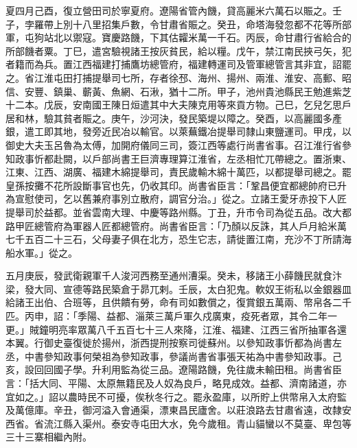\begin{pinyinscope}
 夏四月己酉，復立營田司於寧夏府。遼陽省管內饑，貸高麗米六萬石以賑之。壬子，孛羅帶上別十八里招集戶數，令甘肅省賑之。癸丑，命塔海發忽都不花等所部軍，屯狗站北以禦寇。寶慶路饑，下其估糶米萬一千石。丙辰，命甘肅行省給合的所部饑者粟。丁巳，遣宮驗視諸王按灰貧民，給以糧。戊午，禁江南民挾弓矢，犯者籍而為兵。置江西福建打捕鷹坊總管府，福建轉運司及管軍總管言其非宜，詔罷之。省江淮屯田打捕提舉司七所，存者徐邳、海州、揚州、兩淮、淮安、高郵、昭信、安豐、鎮巢、蘄黃、魚網、石湫，猶十二所。甲子，池州貴池縣民王勉進紫芝十二本。戊辰，安南國王陳日烜遣其中大夫陳克用等來貢方物。己巳，乞兒乞思戶居和林，驗其貧者賑之。庚午，沙河決，發民築堤以障之。癸酉，以高麗國多產銀，遣工即其地，發旁近民冶以輸官。以萊蕪鐵冶提舉司隸山東鹽運司。甲戌，以御史大夫玉呂魯為太傅，加開府儀同三司，簽江西等處行尚書省事。召江淮行省參知政事忻都赴闕，以戶部尚書王巨濟專理算江淮省，左丞相忙兀帶總之。置浙東、江東、江西、湖廣、福建木綿提舉司，責民歲輸木綿十萬匹，以都提舉司總之。罷皇孫按攤不花所設斷事官也先，仍收其印。尚書省臣言：「鞏昌便宜都總帥府已升為宣慰使司，乞以舊兼府事別立散府，調官分治。」從之。立諸王愛牙赤投下人匠提舉司於益都。並省雲南大理、中慶等路州縣。丁丑，升市令司為從五品。改大都路甲匠總管府為軍器人匠都總管府。尚書省臣言：「乃顏以反誅，其人戶月給米萬七千五百二十三石，父母妻子俱在北方，恐生它志，請徙置江南，充沙不丁所請海船水軍。」從之。



 五月庚辰，發武衛親軍千人浚河西務至通州漕渠。癸未，移諸王小薛饑民就食汴梁，發大同、宣德等路民築倉于昴兀剌。壬辰，太白犯鬼。軟奴王術私以金銀器皿給諸王出伯、合班等，且供饋有勞，命有司如數償之，復賞銀五萬兩、幣帛各二千匹。丙申，詔：「季陽、益都、淄萊三萬戶軍久戍廣東，疫死者眾，其令二年一更。」賊鐘明亮率眾萬八千五百七十三人來降，江淮、福建、江西三省所抽軍各還本翼。行御史臺復徙於揚州，浙西提刑按察司徙蘇州。以參知政事忻都為尚書左丞，中書參知政事何榮祖為參知政事，參議尚書省事張天祐為中書參知政事。己亥，設回回國子學。升利用監為從三品。遼陽路饑，免往歲未輸田租。尚書省臣言：「括大同、平陽、太原無籍民及人奴為良戶，略見成效。益都、濟南諸道，亦宜如之。」詔以農時民不可擾，俟秋冬行之。罷永盈庫，以所貯上供幣帛入太府監及萬億庫。辛丑，御河溢入會通渠，漂東昌民廬舍。以莊浪路去甘肅省遠，改隸安西省。省流江縣入渠州。泰安寺屯田大水，免今歲租。青山貓蠻以不莫臺、卑包等三十三寨相繼內附。




\end{pinyinscope}
